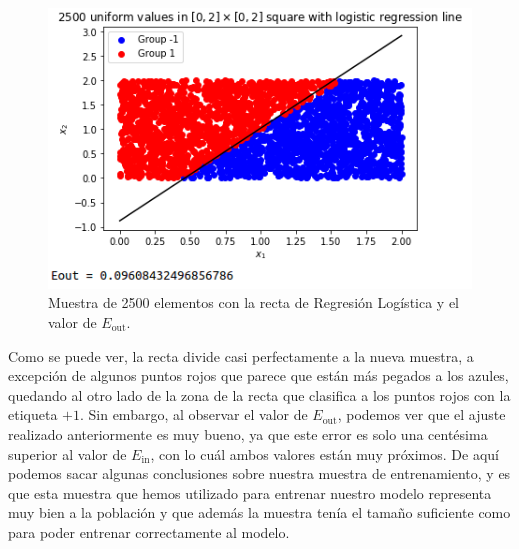 \documentclass[11pt,a4paper]{article}
\newcommand{\eout}{$E_{\text{out}}$}
\newcommand{\ein}{$E_{\text{in}}$}
\begin{document}
\begin{figure}[H]
\centering
\includegraphics[scale=0.6]{img/regression_3.png}
\caption{Muestra de 2500 elementos con la recta de Regresión Logística y el valor de \eout{}.}
\end{figure}

Como se puede ver, la recta divide casi perfectamente a la nueva muestra, a excepción de algunos
puntos rojos que parece que están más pegados a los azules, quedando al otro lado de la zona de
la recta que clasifica a los puntos rojos con la etiqueta $+1$.
Sin embargo, al observar el valor de \eout{}, podemos ver que el ajuste realizado anteriormente
es muy bueno, ya que este error es solo una centésima superior al valor de \ein{}, con lo cuál ambos
valores están muy próximos. De aquí podemos sacar algunas conclusiones sobre nuestra muestra de
entrenamiento, y es que esta muestra que hemos utilizado para entrenar nuestro modelo representa muy
bien a la población y que además la muestra tenía el tamaño suficiente como para poder entrenar
correctamente al modelo.
\end{document}
